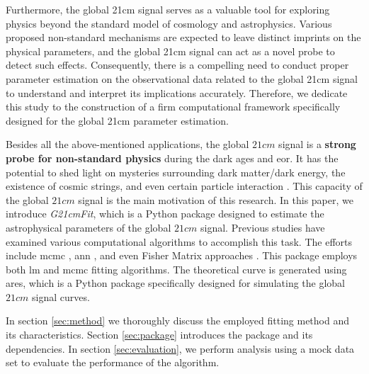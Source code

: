 \documentclass[%
 reprint,
 amsmath,amssymb,
 aps,
]{revtex4-2}
\begin{document}
Furthermore, the global 21cm signal serves as a valuable tool for exploring physics beyond the standard model of cosmology and astrophysics. Various proposed non-standard mechanisms are expected to leave distinct imprints on the physical parameters, and the global 21cm signal can act as a novel probe to detect such effects. Consequently, there is a compelling need to conduct proper parameter estimation on the observational data related to the global 21cm signal to understand and interpret its implications accurately. Therefore, we dedicate this study to the construction of a firm computational framework specifically designed for the global 21cm parameter estimation.\par
Besides all the above-mentioned applications, the global $21cm$ signal is a \textbf{strong probe for non-standard physics} during the dark ages and \gls{eor}. It has the potential to shed light on mysteries surrounding dark matter/dark energy, the existence of cosmic strings, and even certain particle interaction  \cite{dark_nature_21, constrain_dm_21, cosmic_string_brandenberger, ee_interaction_21, neutrino_21}. This capacity of the global $21cm$ signal is the main motivation of this research.
In this paper, we introduce \emph{G21cmFit}, which is a Python package designed to estimate the astrophysical parameters of the global $21cm$ signal. Previous studies have examined various computational algorithms to accomplish this task. The efforts include \gls{mcmc} \cite{pe_mcmc_1, pe_mcmc_2}, \gls{ann} \cite{pe_nn_1}, and even Fisher Matrix approaches \cite{pe_fisher_2}. This package employs both \gls{lm} and \gls{mcmc} fitting algorithms. The theoretical curve is generated using \gls{ares}, which is a Python package specifically designed for simulating the global $21cm$ signal curves.\par
In section \ref{sec:method} we thoroughly discuss the employed fitting method and its characteristics. Section \ref{sec:package} introduces the package and its dependencies. In section \ref{sec:evaluation}, we perform analysis using a mock data set to evaluate the performance of the algorithm.\par
\end{document}
